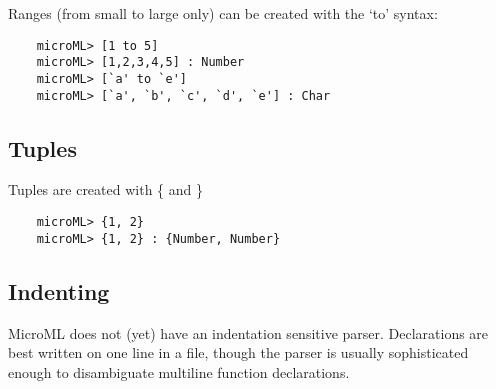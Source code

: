 Ranges (from small to large only) can be created with the `to' syntax:

\begin{verbatim}
    microML> [1 to 5]
    microML> [1,2,3,4,5] : Number
    microML> [`a' to `e'] 
    microML> [`a', `b', `c', `d', `e'] : Char
\end{verbatim}

\subsection{Tuples}
Tuples are created with \{  and \}

\begin{verbatim}
    microML> {1, 2}
    microML> {1, 2} : {Number, Number}
\end{verbatim}

\subsection{Indenting}
MicroML does not (yet) have an indentation sensitive parser. Declarations are best written on one
line in a file, though the parser is usually sophisticated enough to disambiguate multiline function
declarations.

